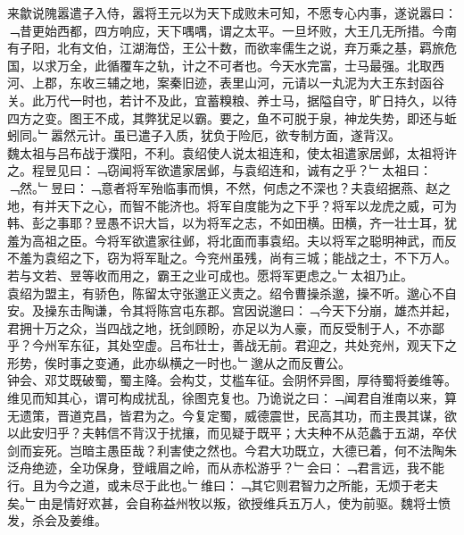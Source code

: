 来歙说隗嚣遣子入侍，嚣将王元以为天下成败未可知，不愿专心内事，遂说嚣曰：﹁昔更始西都，四方响应，天下喁喁，谓之太平。一旦坏败，大王几无所措。今南有子阳，北有文伯，江湖海岱，王公十数，而欲率儒生之说，弃万乘之基，羁旅危国，以求万全，此循覆车之轨，计之不可者也。今天水完富，士马最强。北取西河、上郡，东收三辅之地，案秦旧迹，表里山河，元请以一丸泥为大王东封函谷关。此万代一时也，若计不及此，宜蓄糗粮、养士马，据隘自守，旷日持久，以待四方之变。图王不成，其弊犹足以霸。要之，鱼不可脱于泉，神龙失势，即还与蚯蚓同。﹂嚣然元计。虽已遣子入质，犹负于险厄，欲专制方面，遂背汉。
\\
魏太祖与吕布战于濮阳，不利。袁绍使人说太祖连和，使太祖遣家居邺，太祖将许之。程昱见曰：﹁窃闻将军欲遣家居邺，与袁绍连和，诚有之乎？﹂太祖曰：﹁然。﹂昱曰：﹁意者将军殆临事而惧，不然，何虑之不深也？夫袁绍据燕、赵之地，有并天下之心，而智不能济也。将军自度能为之下乎？将军以龙虎之威，可为韩、彭之事耶？昱愚不识大旨，以为将军之志，不如田横。田横，齐一壮士耳，犹羞为高祖之臣。今将军欲遣家往邺，将北面而事袁绍。夫以将军之聪明神武，而反不羞为袁绍之下，窃为将军耻之。今兖州虽残，尚有三城；能战之士，不下万人。若与文若、昱等收而用之，霸王之业可成也。愿将军更虑之。﹂太祖乃止。
\\
袁绍为盟主，有骄色，陈留太守张邈正义责之。绍令曹操杀邈，操不听。邈心不自安。及操东击陶谦，令其将陈宫屯东郡。宫因说邈曰：﹁今天下分崩，雄杰并起，君拥十万之众，当四战之地，抚剑顾盼，亦足以为人豪，而反受制于人，不亦鄙乎？今州军东征，其处空虚。吕布壮士，善战无前。君迎之，共处兖州，观天下之形势，俟时事之变通，此亦纵横之一时也。﹂邈从之而反曹公。
\\
钟会、邓艾既破蜀，蜀主降。会构艾，艾槛车征。会阴怀异图，厚待蜀将姜维等。维见而知其心，谓可构成扰乱，徐图克复也。乃诡说之曰：﹁闻君自淮南以来，算无遗策，晋道克昌，皆君为之。今复定蜀，威德震世，民高其功，而主畏其谋，欲以此安归乎？夫韩信不背汉于扰攘，而见疑于既平；大夫种不从范蠡于五湖，卒伏剑而妄死。岂暗主愚臣哉？利害使之然也。今君大功既立，大德已着，何不法陶朱泛舟绝迹，全功保身，登峨眉之岭，而从赤松游乎？﹂会曰：﹁君言远，我不能行。且为今之道，或未尽于此也。﹂维曰：﹁其它则君智力之所能，无烦于老夫矣。﹂由是情好欢甚，会自称益州牧以叛，欲授维兵五万人，使为前驱。魏将士愤发，杀会及姜维。
